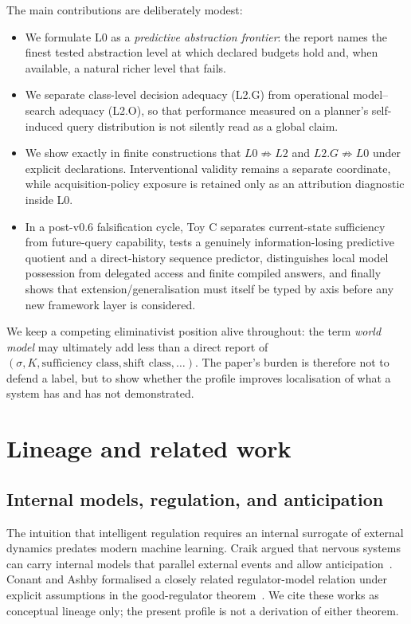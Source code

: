 \documentclass[10pt]{article}
\begin{document}
The main contributions are deliberately modest:
\begin{itemize}
    \item We formulate L0 as a \emph{predictive abstraction frontier}: the report names the finest tested abstraction level at which declared budgets hold and, when available, a natural richer level that fails.
    \item We separate class-level decision adequacy (L2.G) from operational model--search adequacy (L2.O), so that performance measured on a planner's self-induced query distribution is not silently read as a global claim.
    \item We show exactly in finite constructions that $L0\not\Rightarrow L2$ and $L2.G\not\Rightarrow L0$ under explicit declarations. Interventional validity remains a separate coordinate, while acquisition-policy exposure is retained only as an attribution diagnostic inside L0.
    \item In a post-v0.6 falsification cycle, Toy C separates current-state sufficiency from future-query capability, tests a genuinely information-losing predictive quotient and a direct-history sequence predictor, distinguishes local model possession from delegated access and finite compiled answers, and finally shows that extension/generalisation must itself be typed by axis before any new framework layer is considered.
\end{itemize}

We keep a competing eliminativist position alive throughout: the term \emph{world model} may ultimately add less than a direct report of $(\sigma,K,\text{sufficiency class},\text{shift class},\ldots)$. The paper's burden is therefore not to defend a label, but to show whether the profile improves localisation of what a system has and has not demonstrated.

\section{Lineage and related work}

\subsection{Internal models, regulation, and anticipation}

The intuition that intelligent regulation requires an internal surrogate of external dynamics predates modern machine learning. Craik argued that nervous systems can carry internal models that parallel external events and allow anticipation~\cite{craik1943}. Conant and Ashby formalised a closely related regulator-model relation under explicit assumptions in the good-regulator theorem~\cite{conant1970}. We cite these works as conceptual lineage only; the present profile is not a derivation of either theorem.
\end{document}
